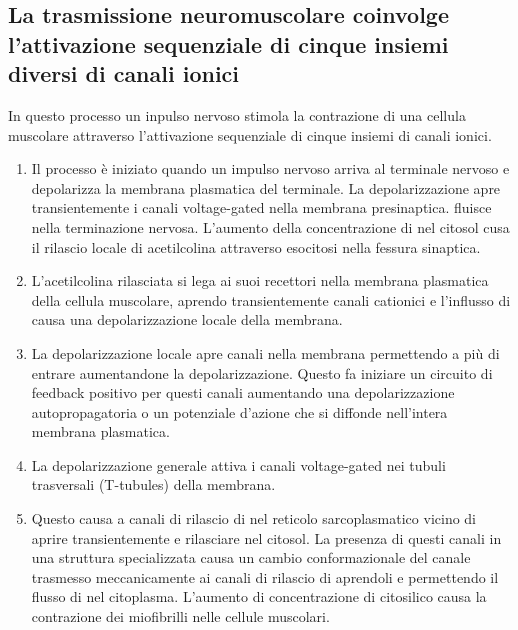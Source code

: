 \subsection{La trasmissione neuromuscolare coinvolge l'attivazione sequenziale di cinque insiemi diversi di canali ionici}
In questo processo un inpulso nervoso stimola la contrazione di una cellula muscolare attraverso l'attivazione sequenziale di cinque insiemi di canali ionici.
\begin{enumerate}
	\item Il processo \`e iniziato quando un impulso nervoso arriva al terminale nervoso e depolarizza la membrana plasmatica del terminale. La depolarizzazione apre transientemente
		i canali voltage-gated  nella membrana presinaptica.  fluisce nella terminazione nervosa. L'aumento della concentrazione di  nel
		citosol cusa il rilascio locale di acetilcolina attraverso esocitosi nella fessura sinaptica.
	\item L'acetilcolina rilasciata si lega ai suoi recettori nella membrana plasmatica della cellula muscolare, aprendo transientemente canali cationici e l'influsso di 
		causa una depolarizzazione locale della membrana.
	\item La depolarizzazione locale apre canali  nella membrana permettendo a pi\`u  di entrare aumentandone la depolarizzazione. Questo fa iniziare un circuito di
		feedback positivo per questi canali aumentando una depolarizzazione autopropagatoria o un potenziale d'azione che si diffonde nell'intera membrana plasmatica.
	\item La depolarizzazione generale attiva i canali  voltage-gated nei tubuli trasversali (T-tubules) della membrana.
	\item Questo causa a canali di rilascio di  nel reticolo sarcoplasmatico vicino di aprire transientemente e rilasciare  nel citosol. La presenza
		di questi canali in una struttura specializzata causa un cambio conformazionale del canale trasmesso meccanicamente ai canali di rilascio di  aprendoli e
		permettendo il flusso di  nel citoplasma. L'aumento di concentrazione di  citosilico causa la contrazione dei miofibrilli nelle cellule muscolari.
\end{enumerate}
